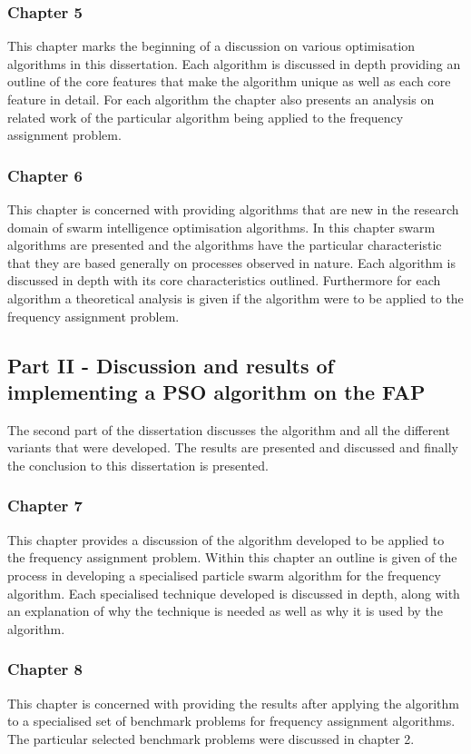 \subsubsection{Chapter 5}
This chapter marks the beginning of a discussion on various optimisation algorithms in this dissertation. Each algorithm is discussed in depth providing an outline of the core features that make the algorithm unique as well as each core feature in detail. For each algorithm the chapter also presents an analysis on related work of the particular algorithm being applied to the frequency assignment problem. 
\subsubsection{Chapter 6}
This chapter is concerned with providing algorithms that are new in the research domain of swarm intelligence optimisation algorithms. In this chapter swarm algorithms are presented and the algorithms have the particular characteristic that they are based generally on processes observed in nature. Each algorithm is discussed in depth with its core characteristics outlined. Furthermore for each algorithm a theoretical analysis is given if the algorithm were to be applied to the frequency assignment problem.
\subsection{Part II - Discussion and results of implementing a PSO algorithm on the FAP}
The second part of the dissertation discusses the algorithm and all the different variants that were developed. The results are presented and discussed and finally the conclusion to this dissertation is presented.
\subsubsection{Chapter 7}
This chapter provides a discussion of the algorithm developed to be applied to the frequency assignment problem. Within this chapter an outline is given of the process in developing a specialised particle swarm algorithm for the frequency algorithm. Each specialised technique developed is discussed in depth, along with an explanation of why the technique is needed as well as why it is used by the algorithm.
\subsubsection{Chapter 8}
This chapter is concerned with providing the results after applying the algorithm to a specialised set of benchmark problems for frequency assignment algorithms. The particular selected benchmark problems were discussed in chapter 2.
